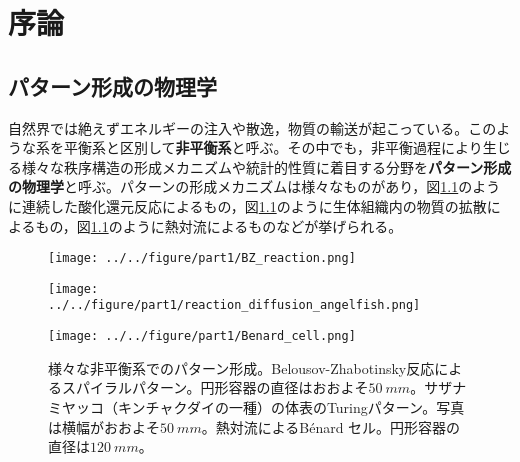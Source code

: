 \documentclass[autodetect-engine,dvi=dvipdfmx,a4paper,ja=standard,oneside,openany,11pt]{bxjsbook}
\begin{document}
\chapter{序論}
\section{パターン形成の物理学}
自然界では絶えずエネルギーの注入や散逸，物質の輸送が起こっている。このような系を平衡系と区別して\textbf{非平衡系}と呼ぶ。その中でも，非平衡過程により生じる様々な秩序構造の形成メカニズムや統計的性質に着目する分野を\textbf{パターン形成の物理学}と呼ぶ。パターンの形成メカニズムは様々なものがあり，図\ref{fig:pattern_formation}のように連続した酸化還元反応によるもの，図\ref{fig:pattern_formation}のように生体組織内の物質の拡散によるもの，図\ref{fig:pattern_formation}のように熱対流によるものなどが挙げられる。

\begin{figure}[htbp]
  \centering
  \begin{minipage}
    {0.32\textwidth}
    \subcaption{}
    \centering
    \texttt{[image: ../../figure/part1/BZ\_reaction.png]}
    \label{fig:BZ}
  \end{minipage}
  \begin{minipage}
    {0.32\textwidth}
    \subcaption{}
    \centering
    \texttt{[image: ../../figure/part1/reaction\_diffusion\_angelfish.png]}
    \label{fig:reaction_diffusion_angelfish}
  \end{minipage}
  \begin{minipage}
    {0.32\textwidth}
    \subcaption{}
    \centering
    \texttt{[image: ../../figure/part1/Benard\_cell.png]}
    \label{fig:Benard_cell}
  \end{minipage}
  \caption{様々な非平衡系でのパターン形成。Belousov-Zhabotinsky反応によるスパイラルパターン\cite{BZ_reaction}。円形容器の直径はおおよそ$\SI{50}{mm}$。サザナミヤッコ（キンチャクダイの一種）の体表のTuringパターン。写真は横幅がおおよそ$\SI{50}{mm}$\cite{kondo1995reaction}。熱対流によるB{\'e}nard セル。円形容器の直径は$\SI{120}{mm}${\cite{eckert1998square}}。}
  \label{fig:pattern_formation}
\end{figure}
\end{document}
